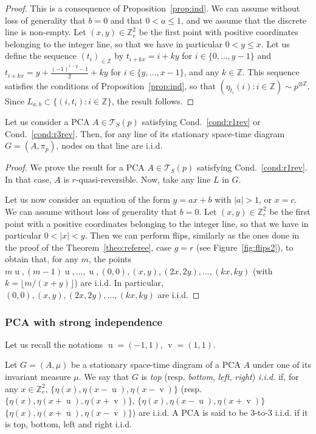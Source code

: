 \documentclass[AHL,Unicode,longabstracts]{cedram}
\newcounter{a}
\newcommand{\Cond}{Cond.}
\newcommand{\triangE}[1]{\mathcal{T}_{#1}}
\newcommand{\Z}{\mathbb{Z}}
\DeclareMathOperator{\vu}{u}
\DeclareMathOperator{\vv}{v}
\begin{document}
\begin{proof}
This is a consequence of Proposition~\ref{prop:ind}. We can assume without loss of generality that $b=0$ and that $0< a \leq 1$, and we assume that the discrete line is non-empty. Let $(x,y)\in\Z_{e}^2$ be the first point with positive coordinates belonging to the integer line, so that we have in particular $0< y \leq x$. Let us define the sequence $(t_i)_{\in \Z}$ by $t_{i+kx}=i+ky$ for $i\in\{0,\ldots,y-1\}$ and $t_{i+kx}=y+\frac{(-1)^{i-y}-1}{2}+ky$ for $i\in\{y,\ldots,x-1\}$, and any $k\in\Z$. This sequence satisfies the conditions of Proposition~\ref{prop:ind}, so that $(\eta_{t_i}(i) : i\in\Z)\sim p^{\otimes \Z}$. Since $L_{a,b}\subset \{(i,t_i) : i\in \Z\}$, the result follows.
\end{proof}

\begin{theo}\label{theo:iid_lines2}
Let us consider a PCA $A\in \triangE{S}(p)$ satisfying \Cond~\ref{cond:r1rev} or \Cond~\ref{cond:r3rev}. Then, for any line of its stationary space-time diagram $G=(A,\pi_p)$, nodes on that line are i.i.d.
\end{theo}

\begin{proof}
We prove the result for a PCA $A\in \triangE{S}(p)$ satisfying \Cond~\ref{cond:r1rev}. In that case, $A$ is $r$-quasi-reversible. Now, take any line $L$ in $G$.

Let us now consider an equation of the form $y=ax+b$ with $|a|>1$, or $x=c$. We can assume without loss of generality that $b=0$. Let $(x,y) \in \Z_{e}^2$ be the first point with a positive coordinates belonging to the integer line, so that we have in particular $0<|x|<y$. Then we can perform flips, similarly as the ones done in the proof of the Theorem~\ref{theo:referee}, case $g=r$ (see Figure~\ref{fig:flips2}), to obtain that, for any $m$, the points $m\vu, (m-1)\vu, \ldots, \vu, (0,0), (x,y), (2x,2y), \dots, (kx,ky)$ (with $k = \lfloor m/(x+y) \rfloor$) are i.i.d. In particular, $(0,0), (x,y), (2x,2y), \dots, (kx,ky)$ are i.i.d.
\end{proof}

\subsubsection*{PCA with strong independence}
Let us recall the notations $\vu= (-1,1)$, $\vv = (1,1)$.

\begin{defi}\label{def:lrind}
Let $G=(A,\mu)$ be a stationary space-time diagram of a PCA $A$ under one of its invariant measure $\mu$. We say that $G$ is \emph{top} (resp. \emph{bottom}, \emph{left}, \emph{right}) \emph{i.i.d.} if, for any $x \in \Z_{e}^2$, $\{\eta(x), \eta(x-\vu),\eta(x-\vv)\}$ (resp.$\{\eta(x),\eta(x+\vu), \eta(x+\vv)\}$, $\{\eta(x),\eta(x-\vu),\eta(x+\vv)\}$ $\{\eta(x),\eta(x+\vu),\eta(x-\vv)\}$) are i.i.d. A PCA is said to be 3-to-3 i.i.d. if it is top, bottom, left and right i.i.d.
\end{defi}
\end{document}
